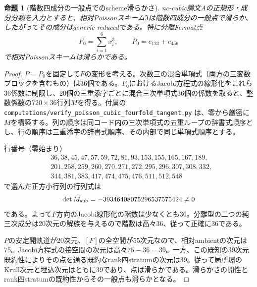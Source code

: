 \documentclass[11pt,a4paper]{ltjsarticle}
\newtheorem{proposition}[theorem]{命題}
\begin{document}
\begin{proposition}[階数四成分の一般点でのscheme滑らかさ]\label{prop:rank4-generically-smooth}
nc-cubic論文Aの正規形・成分分類を入力とすると、相対Poissonスキーム$\mathfrak I$は階数四成分の一般点で滑らか、したがってその成分はgeneric reducedである。特に分離Fermat点
\[
 F_0=\sum_{i=1}^6x_i^3,\qquad P_0=e_{123}+e_{456}
\]
で相対Poissonスキームは滑らかである。
\end{proposition}
\begin{proof}
$P=P_0$を固定して$F$の変形を考える。次数三の混合単項式（両方の三変数ブロックを含むもの）は36個である。$F_0$におけるJacobi方程式の線形化をこれら36係数に制限し、20個の三重添字ごとに混合三次単項式36個の係数を取ると、整数係数の$720\times36$行列$M$を得る。付属の \texttt{computations/verify\_poisson\_cubic\_fourfold\_tangent.py} は、零から厳密に$M$を構築する。列の順序は同コード内の三次単項式の五重ループの辞書式順序とし、行の順序は三重添字の辞書式順序、その内部で同じ単項式順序とする。

行番号（零始まり）
\[
\begin{split}
&36,38,45,47,57,59,72,81,93,153,155,165,167,189,\\
&201,258,259,260,270,271,272,295,296,307,308,332,\\
&344,381,383,417,474,475,476,511,512,548
\end{split}
\]
で選んだ正方小行列の行列式は
\[
 \det M_{\rm sub}=-39346408075296537575424\ne0
\]
である。よって$F$方向のJacobi線形化の階数は少なくとも36。分離型の二つの純三次成分は20次元の解族を与えるので階数は高々36、従って正確に36である。

$P$の安定開軌道が20次元、$[F]$の全空間が55次元なので、相対ambientの次元は75。Jacobi方程式の接空間の次元は高々$75-36=39$。一方、この既知の39次元既約性によりその点を通る既約なrank四stratumの次元は39。従って局所環のKrull次元と埋込次元はともに39であり、点は滑らかである。滑らかさの開性とrank四stratumの既約性からその一般点も滑らかとなる。
\end{proof}
\end{document}
